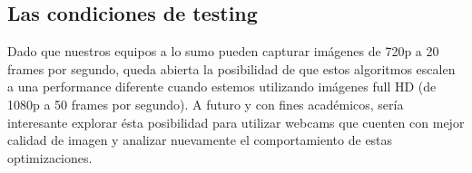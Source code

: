 \subsection{Las condiciones de testing}
Dado que nuestros equipos a lo sumo pueden capturar im\'agenes de 720p a 20 frames por segundo, queda abierta la posibilidad de que estos algoritmos escalen a una performance diferente cuando estemos utilizando im\'agenes full HD (de 1080p a 50 frames por segundo). A futuro y con fines acad\'emicos, ser\'ia interesante explorar \'esta posibilidad para utilizar webcams que cuenten con mejor calidad de imagen y analizar nuevamente el comportamiento de estas optimizaciones.\\

